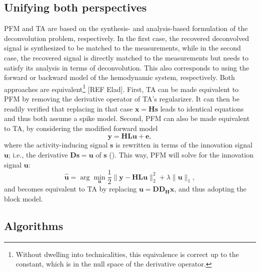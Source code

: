 \subsection{Unifying both perspectives}

PFM and TA are based on the synthesis- and analysis-based formulation of the deconvolution problem, respectively. In the first case, the recovered deconvolved signal is synthesized to be matched to the measurements, while in the second case, the recovered signal is directly matched to the measurements but needs to satisfy its analysis in terms of deconvolution. This also corresponds to using the forward or backward model of the hemodynamic system, respectively. Both approaches are equivalent\footnote{Without dwelling into technicalities, this equivalence is correct up to the constant, which is in the null space of the derivative operator.} [REF Elad]. First, TA can be made equivalent to PFM by removing the derivative operator of TA's regularizer. It can then be readily verified that replacing in that case $\mathbf{x}=\mathbf{Hs}$ leads to identical equations and thus both assume a spike model. Second, PFM can also be made equivalent to TA, by considering the modified forward model
$$
\mathbf{y} = \mathbf{H L u} + \mathbf{e},
$$
where the activity-inducing signal $\mathbf{s}$ is rewritten in terms of the innovation signal $\mathbf{u}$; i.e., the derivative $\mathbf{Ds}=\mathbf{u}$ of $\mathbf{s}$ (\citealt{cherkaoui2019SparsitybasedBlindDeconvolution,urunuela2020StabilityBasedSparseParadigm}). This way, PFM will solve for the innovation signal $\mathbf{u}$: 
\begin{equation}
    \label{eq:pfm_block}
    \hat{\mathbf{u}} = \arg \min_{\mathbf{u}} \frac{1}{2} \| \mathbf{y} - \mathbf{HLu} \|_2^2 + \lambda \| \mathbf{u} \|_1,
\end{equation}
and becomes equivalent to TA by replacing $\mathbf{u}=\mathbf{D D_H x}$, and thus adopting the block model.

\subsection{Algorithms}

